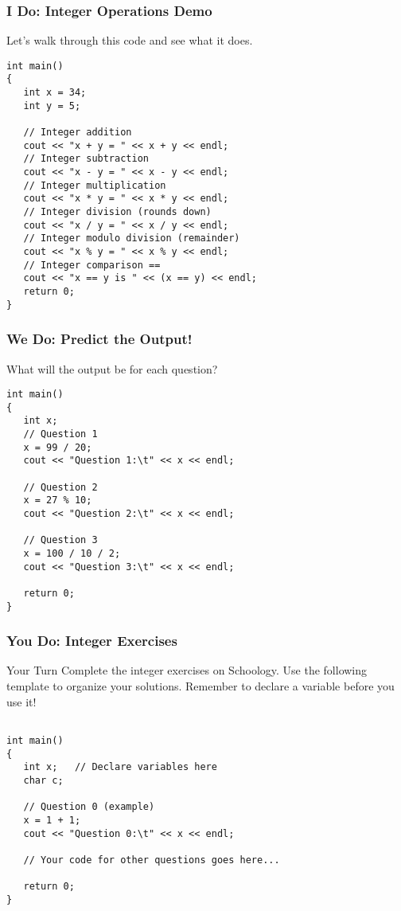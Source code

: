 \documentclass{beamer}
\begin{document}
\begin{frame}[fragile]
\frametitle{I Do: Integer Operations Demo}
Let's walk through this code and see what it does.
\begin{verbatim}
int main()
{
   int x = 34;
   int y = 5;

   // Integer addition
   cout << "x + y = " << x + y << endl;
   // Integer subtraction
   cout << "x - y = " << x - y << endl;
   // Integer multiplication
   cout << "x * y = " << x * y << endl;
   // Integer division (rounds down)
   cout << "x / y = " << x / y << endl;
   // Integer modulo division (remainder)
   cout << "x % y = " << x % y << endl;
   // Integer comparison ==
   cout << "x == y is " << (x == y) << endl;
   return 0;
}
\end{verbatim}
\end{frame}

\begin{frame}[fragile]
\frametitle{We Do: Predict the Output!}
What will the output be for each question?
\begin{verbatim}
int main()
{
   int x;
   // Question 1
   x = 99 / 20;
   cout << "Question 1:\t" << x << endl;

   // Question 2
   x = 27 % 10;
   cout << "Question 2:\t" << x << endl;

   // Question 3
   x = 100 / 10 / 2;
   cout << "Question 3:\t" << x << endl;

   return 0;
}
\end{verbatim}
\end{frame}

\begin{frame}[fragile]
\frametitle{You Do: Integer Exercises}
\begin{block}{Your Turn}
Complete the integer exercises on Schoology. Use the following template to organize your solutions. Remember to declare a variable before you use it!
\end{block}
\begin{verbatim}

int main()
{
   int x;   // Declare variables here
   char c;

   // Question 0 (example)
   x = 1 + 1;
   cout << "Question 0:\t" << x << endl;

   // Your code for other questions goes here...

   return 0;
}
\end{verbatim}
\end{frame}
\end{document}
